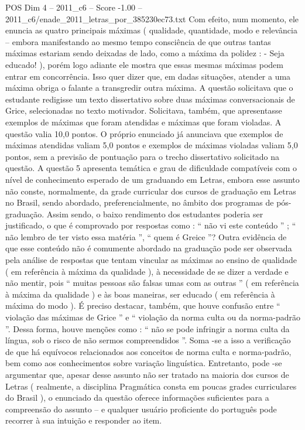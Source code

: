 \begin{textsample}{POS Dim 4 – 2011\_c6 – Score -1.00 – 2011\_c6/enade\_2011\_letras\_por\_385230ec73.txt}
Com efeito, num momento, ele enuncia as quatro principais máximas ( qualidade, quantidade, modo e relevância – embora manifestando ao mesmo tempo consciência de que outras tantas máximas estariam sendo deixadas de lado, como a máxima da polidez : - Seja educado! ), porém logo adiante ele mostra que essas mesmas máximas podem entrar em concorrência.
Isso quer dizer que, em dadas situações, atender a uma máxima obriga o falante a transgredir outra máxima.
A questão solicitava que o estudante redigisse um texto dissertativo sobre duas máximas conversacionais de Grice, selecionadas no texto motivador.
Solicitava, também, que apresentasse exemplos de máximas que foram atendidas e máximas que foram violadas.
A questão valia 10,0 pontos.
O próprio enunciado já anunciava que exemplos de máximas atendidas valiam 5,0 pontos e exemplos de máximas violadas valiam 5,0 pontos, sem a previsão de pontuação para o trecho dissertativo solicitado na questão.
A questão 5 apresenta temática e grau de dificuldade compatíveis com o nível de conhecimento esperado de um graduando em Letras, embora esse assunto não conste, normalmente, da grade curricular dos cursos de graduação em Letras no Brasil, sendo abordado, preferencialmente, no âmbito dos programas de pós-graduação.
Assim sendo, o baixo rendimento dos estudantes poderia ser justificado, o que é comprovado por respostas como : “ não vi este conteúdo ” ; “ não lembro de ter visto essa matéria ”, “ quem é Greice ”?
Outra evidência de que esse conteúdo não é comumente abordado na graduação pode ser observada pela análise de respostas que tentam vincular as máximas ao ensino de qualidade ( em referência à máxima da qualidade ), à necessidade de se dizer a verdade e não mentir, pois “ muitas pessoas são falsas umas com as outras ” ( em referência à máxima da qualidade ) e às boas maneiras, ser educado ( em referência à máxima do modo ).
É preciso destacar, também, que houve confusão entre “ violação das máximas de Grice ” e “ violação da norma culta ou da norma-padrão ”.
Dessa forma, houve menções como : “ não se pode infringir a norma culta da língua, sob o risco de não sermos compreendidos ”.
Soma -se a isso a verificação de que há equívocos relacionados aos conceitos de norma culta e norma-padrão, bem como aos conhecimentos sobre variação linguística.
Entretanto, pode -se argumentar que, apesar desse assunto não ser tratado na maioria dos cursos de Letras ( realmente, a disciplina Pragmática consta em poucas grades curriculares do Brasil ), o enunciado da questão oferece informações suficientes para a compreensão do assunto – e qualquer usuário proficiente do português pode recorrer à sua intuição e responder ao item.

\end{textsample}
